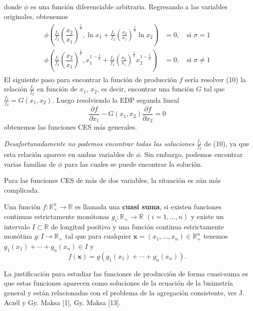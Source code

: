 \documentclass[a4paper,fleqn]{cas-dc}
\begin{document}
donde $\phi$ es una función diferenciable arbitraria. Regresando a las variables originales, obtenemos
\begin{align}
\begin{split}
\phi\left(\frac{f_{1}}{f_{2}}{\left(\dfrac{x_{2}}{x_{1}}\right)}^{\frac{1}{\sigma}},\ln x_{1}+\frac{f_{1}}{f_{2}}{\left(\frac{x_{2}}{x_{1}}\right)}^{\frac{1}{\sigma}}\ln x_{2}\right)
&=0,\quad\text{si }\sigma=1\\
\phi\left(\frac{f_{1}}{f_{2}}{\left(\dfrac{x_{2}}{x_{1}}\right)}^{\frac{1}{\sigma}},x^{1-\frac{1}{\sigma}}_{1}+\frac{f_{1}}{f_{2}}{\left(\frac{x_{2}}{x_{1}}\right)}^{\frac{1}{\sigma}}x^{1-\frac{1}{\sigma}}_{2}\right)
&=0,\quad\text{si }\sigma\neq1
\end{split}
\end{align}
El siguiente paso para encontrar la función de producción $f$ sería resolver (10) la relación $\frac{f_{1}}{f_{2}}$ en función de $x_{1}$, $x_{2}$, es decir, encontrar una función $G$ tal que $\frac{f_{1}}{f_{2}}=G\left(x_{1},x_{2}\right)$. Luego resolviendo la EDP segunda lineal \[ \frac{\partial f}{\partial x_{1}}-G\left(x_{1},x_{2}\right)\frac{\partial f}{\partial x_{2}}=0 \] obtenemos las funciones CES más generales.

\emph{Desafortunadamente no podemos encontrar todas las soluciones} $\frac{f_{1}}{f_{2}}$ de (10), ya que esta relación aparece en ambas variables de $\phi$. Sin embargo, podemos encontrar varias familias de $\phi$ para las cuales se puede encontrar la solución.

Para las funciones CES de más de dos variables, la situación es aún más complicada.

\begin{definition}
Una función $f\colon\mathds{R}^{n}_{+}\rightarrow\mathds{R}$ es llamada una \textbf{cuasi suma}, si existen funciones continuas estrictamente monótonas $g_{i}\colon\mathds{R}_{+}\rightarrow\mathds{R}$ $(i=1,\ldots,n)$ y existe un intervalo $I\subset\mathds{R}$ de longitud positiva y una función continua estrictamente monótina $g\colon I\rightarrow\mathds{R}_{+}$ tal que para cualquier $\bm{x}=\left(x_{1},\ldots,x_{n}\right)\in\mathds{R}^{n}_{+}$ tenemos $g_{1}\left(x_{1}\right)+\cdots+g_{n}\left(x_{n}\right)\in I$ y
\begin{equation}
f\left(\bm{x}\right)=g\left(g_{1}\left(x_{1}\right)+\cdots+g_{n}\left(x_{n}\right)\right).
\end{equation}
\end{definition}
La justificación para estudiar las funciones de producción de forma cuasi-suma es que estas funciones aparecen como soluciones de la ecuación de la bisimetría general y están relacionadas con el problema de la agregación consistente, ver J. Aczél y Gy. Maksa [1], Gy. Maksa [13].
\end{document}
